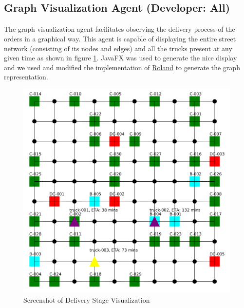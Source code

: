 \documentclass[11pt, a4paper]{article}
\begin{document}
\newpage
\subsection{Graph Visualization Agent (Developer: All)}\label{GraphVisualizationAgent}
\paragraph{}
The graph visualization agent facilitates observing the delivery process of the orders in a graphical way. This agent is capable of displaying the entire street network (consisting of its nodes and edges) and all the trucks present at any given time as shown in figure \ref{VisualizationScreenshot}. JavaFX was used to generate the nice display and we used and modified the implementation of \href{https://stackoverflow.com/a/30696075}{Roland} to generate the graph representation.

\begin{figure}[h!]
	\centering
	\includegraphics[width=\textwidth]{Visualization.png}
	\caption{Screenshot of Delivery Stage Visualization}
	\label{VisualizationScreenshot}
\end{figure}
\end{document}
